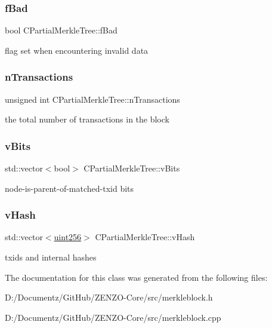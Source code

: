 \subsubsection{\texorpdfstring{fBad}{fBad}}
{\footnotesize\ttfamily bool C\+Partial\+Merkle\+Tree\+::f\+Bad\hspace{0.3cm}{\ttfamily [protected]}}

flag set when encountering invalid data \mbox{\label{class_c_partial_merkle_tree_a0d3bd530f19f2c75c140a05c6f99782a}} 
\subsubsection{\texorpdfstring{nTransactions}{nTransactions}}
{\footnotesize\ttfamily unsigned int C\+Partial\+Merkle\+Tree\+::n\+Transactions\hspace{0.3cm}{\ttfamily [protected]}}

the total number of transactions in the block \mbox{\label{class_c_partial_merkle_tree_a22a522d1fb8d449f4c91b65283339e7d}} 
\subsubsection{\texorpdfstring{vBits}{vBits}}
{\footnotesize\ttfamily std\+::vector$<$bool$>$ C\+Partial\+Merkle\+Tree\+::v\+Bits\hspace{0.3cm}{\ttfamily [protected]}}

node-\/is-\/parent-\/of-\/matched-\/txid bits \mbox{\label{class_c_partial_merkle_tree_a863cf9024be1b8fa97db08dfd6dbd687}} 
\subsubsection{\texorpdfstring{vHash}{vHash}}
{\footnotesize\ttfamily std\+::vector$<$\mbox{\hyperlink{classuint256}{uint256}}$>$ C\+Partial\+Merkle\+Tree\+::v\+Hash\hspace{0.3cm}{\ttfamily [protected]}}

txids and internal hashes 

The documentation for this class was generated from the following files\+:\begin{DoxyCompactItemize}
\item 
D\+:/\+Documentz/\+Git\+Hub/\+Z\+E\+N\+Z\+O-\/\+Core/src/merkleblock.\+h\item 
D\+:/\+Documentz/\+Git\+Hub/\+Z\+E\+N\+Z\+O-\/\+Core/src/merkleblock.\+cpp\end{DoxyCompactItemize}
